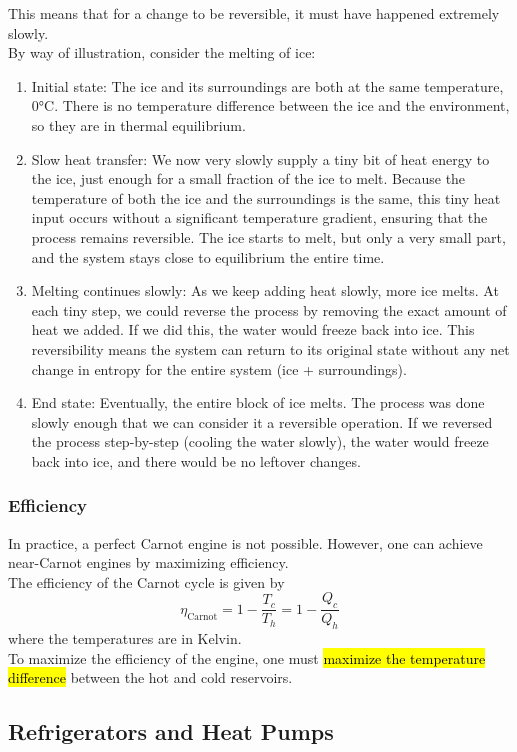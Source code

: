\documentclass[a4paper,12pt]{article}
\newcommand{\lb}{\\[8pt]}
\begin{document}
This means that for a change to be reversible, it must have happened extremely slowly.\lb
By way of illustration, consider the melting of ice:
\begin{enumerate}
  \item Initial state: The ice and its surroundings are both at the same temperature, 0°C. There is no temperature difference between the ice and the environment, so they are in thermal equilibrium.

  \item Slow heat transfer: We now very slowly supply a tiny bit of heat energy to the ice, just enough for a small fraction of the ice to melt. Because the temperature of both the ice and the surroundings is the same, this tiny heat input occurs without a significant temperature gradient, ensuring that the process remains reversible. The ice starts to melt, but only a very small part, and the system stays close to equilibrium the entire time.

  \item Melting continues slowly: As we keep adding heat slowly, more ice melts. At each tiny step, we could reverse the process by removing the exact amount of heat we added. If we did this, the water would freeze back into ice. This reversibility means the system can return to its original state without any net change in entropy for the entire system (ice + surroundings).

  \item End state: Eventually, the entire block of ice melts. The process was done slowly enough that we can consider it a reversible operation. If we reversed the process step-by-step (cooling the water slowly), the water would freeze back into ice, and there would be no leftover changes.
\end{enumerate}

\subsubsection{Efficiency}
In practice, a perfect Carnot engine is not possible. However, one can achieve near-Carnot engines by maximizing efficiency.\lb
The efficiency of the Carnot cycle is given by
$$\eta_{\text{Carnot}} = 1 - \dfrac{T_c}{T_h} = 1 - \dfrac{Q_c}{Q_h}$$
where the temperatures are in Kelvin.\lb
To maximize the efficiency of the engine, one must \hl{maximize the temperature difference} between the hot and cold reservoirs.

\pagebreak

\subsection{Refrigerators and Heat Pumps}
\end{document}
